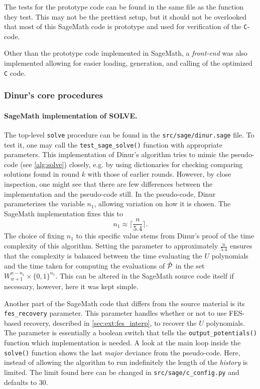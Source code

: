 The tests for the prototype code can be found in the same file as the function they test. This may not be the prettiest setup, but it should not be overlooked that most of this SageMath code is prototype and used for verification of the \texttt{C}-code.

Other than the prototype code implemented in SageMath, a \textit{front-end} was also implemented allowing for easier loading, generation, and calling of the optimized \texttt{C} code. 

\subsubsection{Dinur's core procedures}
\paragraph{SageMath implementation of SOLVE.}
The top-level \texttt{solve} procedure can be found in the \texttt{src/sage/dinur.sage} file. To test it, one may call the \texttt{test\_sage\_solve()} function with appropriate parameters. This implementation of Dinur's algorithm tries to mimic the pseudo-code (see \cref{alg:solve}) closely, e.g. by using dictionaries for checking comparing solutions found in round $k$ with those of earlier rounds. However, by close inspection, one might see that there are few differences between the implementation and the pseudo-code still. In the pseudo-code, Dinur parameterizes the variable $n_1$, allowing variation on how it is chosen. The SageMath implementation fixes this to 
$$
    n_1 \approx \lceil \frac{n}{5.4} \rceil.
$$
The choice of fixing $n_1$ to this specific value stems from Dinur's proof of the time complexity of this algorithm. Setting the parameter to approximately $\frac{n}{5.4}$ ensures that the complexity is balanced between the time evaluating the $U$ polynomials and the time taken for computing the evaluations of $\Tilde{\mathcal{P}}$ in the set $W^{n - n_1}_{w + 1} \times \{0,1\}^{n_1}$. This can be altered in the SageMath source code itself if necessary, however, here it was kept simple.

Another part of the SageMath code that differs from the source material is its 
\texttt{fes\_recovery} parameter. This parameter handles whether or not to use FES-based recovery, described in \cref{sec:ext:fes_interp}, to recover the $U$ polynomials. The parameter is essentially a boolean switch that tells the \texttt{output\_potentials()} function which implementation is needed. A look at the main loop inside the \texttt{solve()} function shows the last \textit{major} deviance from the pseudo-code. Here, instead of allowing the algorithm to run indefinitely the length of the \textit{history} is limited. The limit found here can be changed in \texttt{src/sage/c\_config.py} and defaults to 30.

